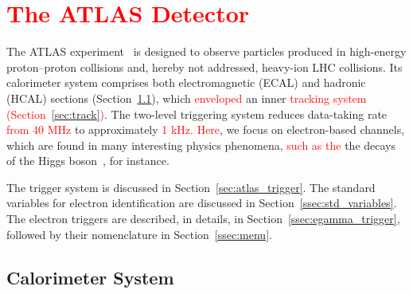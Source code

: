 \chapter{\textcolor{red}{The ATLAS Detector}}\label{sec:context}



The ATLAS experiment~\cite{PERF-2007-01} is designed to observe particles
produced in high-energy proton--proton collisions and, hereby not addressed,
heavy-ion LHC collisions. Its calorimeter system comprises both 
electromagnetic (ECAL) and hadronic (HCAL)
sections (Section~\ref{ssec:calo}), which \textcolor{red}{enveloped} an inner \textcolor{red}{tracking system (Section~\ref{sec:track})}. The two-level triggering system reduces data-taking rate \textcolor{red}{from 40 MHz} to approximately \textcolor{red}{1 kHz. Here}, we focus on electron-based channels, which are
found in many interesting physics phenomena, \textcolor{red}{such as the} the decays of the Higgs
boson~\cite{HIGG-2012-27,HIGG-2016-33}, for instance.


The trigger system is discussed in Section~\ref{sec:atlas_trigger}.
The standard variables for electron identification are discussed in
Section~\ref{ssec:std_variables}. The electron triggers are described, in details, in
Section~\ref{ssec:egamma_trigger}, followed by their nomenclature in
Section~\ref{ssec:menu}.  




\section{Calorimeter System}\label{ssec:calo}

